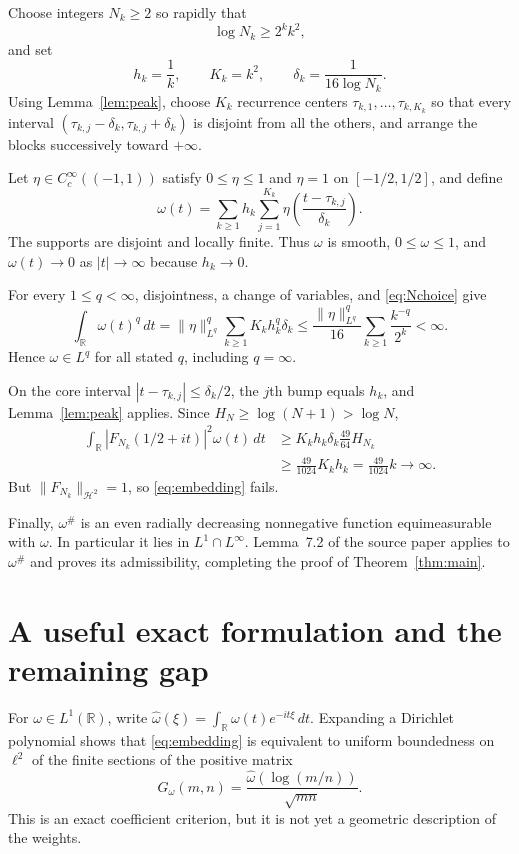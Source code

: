 \documentclass[11pt]{article}
\newcommand{\HH}{\mathscr H^2}
\newcommand{\R}{\mathbb R}
\begin{document}
Choose integers $N_k\geq2$ so rapidly that
\begin{equation}\label{eq:Nchoice}
 \log N_k\geq 2^k k^2,
\end{equation}
and set
\[
 h_k=\frac1k,\qquad K_k=k^2,
 \qquad \delta_k=\frac1{16\log N_k}.
\]
Using Lemma~\ref{lem:peak}, choose $K_k$ recurrence centers
$\tau_{k,1},\ldots,\tau_{k,K_k}$ so that every interval
$(\tau_{k,j}-\delta_k,\tau_{k,j}+\delta_k)$ is disjoint from all the
others, and arrange the blocks successively toward $+\infty$.

Let $\eta\in C_c^\infty((-1,1))$ satisfy $0\leq\eta\leq1$ and
$\eta=1$ on $[-1/2,1/2]$, and define
\begin{equation}\label{eq:omega}
 \omega(t)=\sum_{k\geq1}h_k\sum_{j=1}^{K_k}
 \eta\left(\frac{t-\tau_{k,j}}{\delta_k}\right).
\end{equation}
The supports are disjoint and locally finite.  Thus $\omega$ is smooth,
$0\leq\omega\leq1$, and $\omega(t)\to0$ as $|t|\to\infty$ because
$h_k\to0$.

For every $1\leq q<\infty$, disjointness, a change of variables, and
\eqref{eq:Nchoice} give
\[
 \int_{\R}\omega(t)^q\,dt
 =\|\eta\|_{L^q}^q
 \sum_{k\geq1}K_kh_k^q\delta_k
 \leq \frac{\|\eta\|_{L^q}^q}{16}
 \sum_{k\geq1}\frac{k^{-q}}{2^k}<\infty.
\]
Hence $\omega\in L^q$ for all stated $q$, including $q=\infty$.

On the core interval
$|t-\tau_{k,j}|\leq\delta_k/2$, the $j$th bump equals $h_k$, and
Lemma~\ref{lem:peak} applies.  Since $H_N\geq\log(N+1)>\log N$,
\begin{align*}
 \int_{\R}|F_{N_k}(1/2+it)|^2\omega(t)\,dt
 &\geq K_k h_k\delta_k\frac{49}{64}H_{N_k}\\
 &\geq \frac{49}{1024}K_kh_k
 =\frac{49}{1024}k\longrightarrow\infty.
\end{align*}
But $\|F_{N_k}\|_{\HH}=1$, so \eqref{eq:embedding} fails.

Finally, $\omega^\#$ is an even radially decreasing nonnegative function
equimeasurable with $\omega$.  In particular it lies in
$L^1\cap L^\infty$.  Lemma~7.2 of the source paper applies to
$\omega^\#$ and proves its admissibility, completing the proof of
Theorem~\ref{thm:main}.

\section{A useful exact formulation and the remaining gap}

For $\omega\in L^1(\R)$, write
$\widehat\omega(\xi)=\int_{\R}\omega(t)e^{-it\xi}\,dt$.  Expanding a
Dirichlet polynomial shows that \eqref{eq:embedding} is equivalent to
uniform boundedness on $\ell^2$ of the finite sections of the positive
matrix
\begin{equation}\label{eq:gram}
 G_\omega(m,n)=
 \frac{\widehat\omega(\log(m/n))}{\sqrt{mn}}.
\end{equation}
This is an exact coefficient criterion, but it is not yet a geometric
description of the weights.
\end{document}
